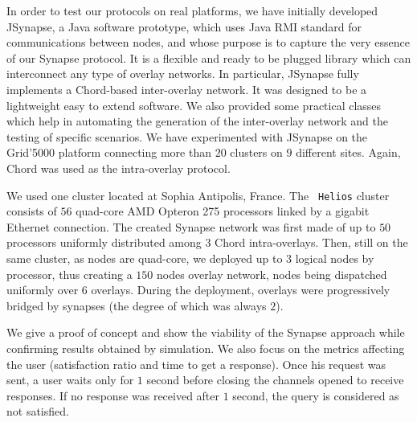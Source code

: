 %
 In order to test our protocols on real
platforms, we have initially developed JSynapse, a Java software
prototype, which uses Java RMI standard for communications between
nodes, and whose purpose is to capture the very essence of our Synapse
protocol. It is a flexible and ready to be plugged library which can
interconnect any type of overlay networks.  In particular, JSynapse
fully implements a Chord-based inter-overlay network.  It was designed
to be a lightweight easy to extend software. We also provided some
practical classes which help in automating the generation of the
inter-overlay network and the testing of specific scenarios.
%
%
We have experimented with JSynapse on the Grid'5000 platform
connecting more than $20$ clusters on $9$ different sites. Again,
Chord was used as the intra-overlay protocol.

We used one cluster located at Sophia Antipolis, France. The {\tt
  Helios} cluster consists of $56$ quad-core AMD Opteron 275
processors linked by a gigabit Ethernet connection. The created
Synapse network was first made of up to $50$ processors uniformly
distributed among $3$ Chord intra-overlays. Then, still on the same
cluster, as nodes are quad-core, we deployed up to $3$ logical nodes
by processor, thus creating a $150$ nodes overlay network, nodes being
dispatched uniformly over $6$ overlays. During the deployment,
overlays were progressively bridged by synapses (the degree of which
was always $2$).

We give a proof of concept and show the viability of the Synapse
approach while confirming results obtained by simulation. We also
focus on the metrics affecting the user (satisfaction ratio and time
to get a response). Once his request was sent, a user waits only for $1$
second before closing the channels opened to receive responses. If no
response was received after $1$ second, the query is considered as not
satisfied.

